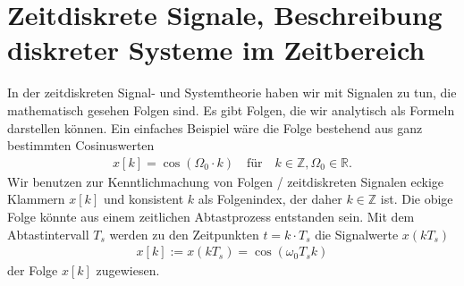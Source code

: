 \clearpage
\section{Zeitdiskrete Signale, Beschreibung diskreter Systeme im Zeitbereich}
%
In der zeitdiskreten Signal- und Systemtheorie haben wir mit Signalen zu tun,
die mathematisch gesehen Folgen sind. Es gibt Folgen, die wir analytisch
als Formeln darstellen können.
Ein einfaches Beispiel wäre die Folge bestehend aus ganz bestimmten Cosinuswerten
\begin{align}
x[k] = \cos(\Omega_0 \cdot k)\quad\text{für}\quad k\in\mathbb{Z}, \Omega_0\in\mathbb{R}.
\end{align}
Wir benutzen zur Kenntlichmachung von Folgen / zeitdiskreten Signalen eckige
Klammern $x[k]$ und konsistent $k$ als Folgenindex, der daher $k\in\mathbb{Z}$ ist.
%
Die obige Folge könnte aus einem zeitlichen Abtastprozess entstanden sein. Mit dem
Abtastintervall $T_s$ werden zu den Zeitpunkten $t = k \cdot T_s$
die Signalwerte $x(k T_s)$
\begin{align}
x[k] := x(k T_s) = \cos(\omega_0 T_s k)
\end{align}
der Folge $x[k]$ zugewiesen.
%
